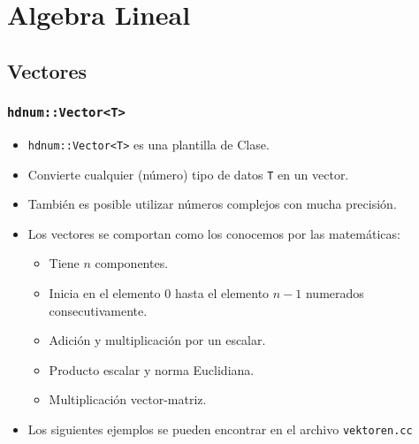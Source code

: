 \documentclass[a4paper,11pt]{article}
\theoremstyle{definition}
\begin{document}
\section{Algebra Lineal}

\subsection{Vectores}

\begin{frame}[fragile]
\frametitle{\lstinline{hdnum::Vector<T>}}
\begin{itemize}
\item \lstinline{hdnum::Vector<T>} es una plantilla de Clase.
\item Convierte cualquier (número)  tipo de datos \lstinline{T} en un vector. 
\item También es posible utilizar números complejos con mucha precisión.
\item Los vectores se comportan como los conocemos por las matemáticas:
\begin{itemize}
\item Tiene $n$ componentes.
\item Inicia en el elemento $0$ hasta el elemento $n-1$ numerados consecutivamente.
\item Adición y multiplicación por un escalar.
\item Producto escalar y norma Euclidiana.
\item Multiplicación vector-matriz.
\end{itemize}
\item Los siguientes ejemplos se pueden encontrar en el archivo \lstinline{vektoren.cc}
\end{itemize}
\end{frame}
\end{document}
